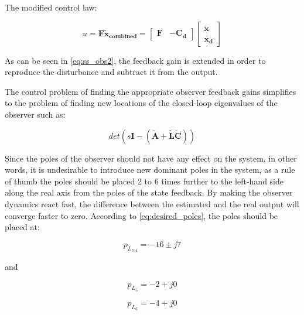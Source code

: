 The modified control law:

\begin{equation}
  \label{eq:ss_obs2}
  u =  \mathbf{F} \mathbf{\tilde{x}_{combined}} 
  =
 \begin{bmatrix}
    \mathbf{F} & \mathbf{-C_d}  
\end{bmatrix}
 \begin{bmatrix}
\mathbf{\tilde{x}}  \\
\mathbf{\tilde{x_d}}
\end{bmatrix}
  \end{equation}
  
As can be seen in \eqref{eq:ss_obs2}, the feedback gain is extended in order to reproduce the disturbance and subtract it from the output. 
  
The control problem of finding the appropriate observer feedback gains simplifies to the problem of finding new locations of the closed-loop eigenvalues of the observer such as:

\begin{equation}
  \label{eq:distpoly}
    det(s\mathbf{I}-(\mathbf{\tilde{A}} + \mathbf{\tilde{L}} \mathbf{\tilde{C}}))
  \end{equation}

Since the poles of the observer should not have any effect on the system, in other words, it is undesirable to introduce new dominant poles in the system, as a rule of thumb the poles should be placed 2 to 6 times further to the left-hand side along the real axis from the poles of the state feedback. By making the observer dynamics react fast, the difference between the estimated and the real output will converge faster to zero. According to \eqref{eq:desired_poles}, the poles should be placed at: 

\begin{equation}
  \label{eq:desired_poles_observer1}
  p_{L_{3;4}} = -16 \pm j7
  \end{equation}
  
and
  
\begin{equation}
  \label{eq:desired_poles_observer2}
  p_{L_{5}} = -2 +j0
  \end{equation}
  
  \begin{equation}
  \label{eq:desired_poles_observer3}
  p_{L_{6}} = -4 +j0
  \end{equation}
  

  
  
  